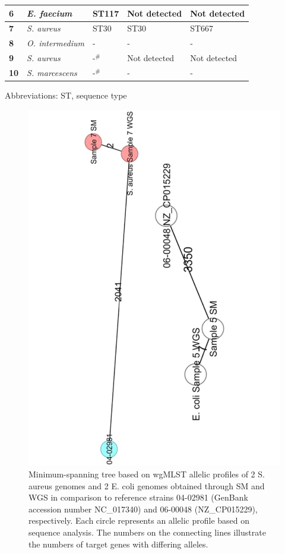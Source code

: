 \begin{table}[]
{\begin{tabular}{@{}|l|l|l|ll|@{}}
\textbf{6} &
 \textit{ E. faecium} &
  ST117 &
  \multicolumn{1}{l|}{Not detected} &
  Not detected \\ \midrule
\textbf{7} &
  \textit{S. aureus} &
  ST30 &
  \multicolumn{1}{l|}{ST30} &
  ST667 \\ \midrule
\textbf{8} &
  \textit{O. intermedium} &
  - &
  \multicolumn{1}{l|}{-} &
  - \\ \midrule
\textbf{9} &
  \textit{S. aureus} &
  -$^\#$  &
  \multicolumn{1}{l|}{Not detected} &
  Not detected \\ \midrule
\textbf{10} &
  \textit{S. marcescens} &
  -$^\#$ &
  \multicolumn{1}{l|}{-} &
  - \\ \bottomrule
\end{tabular}%
}
\item Abbreviations: ST, sequence type
\end{table}

\begin{figure}[h!]
\centering
\includegraphics[angle=-90,width=\textwidth]{figures/chapter 2/41598_2018_31873_Fig2_HTML.pdf}
\caption{Minimum-spanning tree based on wgMLST allelic profiles of 2 S. aureus genomes and 2 E. coli genomes obtained through SM and \ac{WGS} in comparison to reference strains 04-02981 (GenBank accession number NC\_017340) and 06-00048 (NZ\_CP015229), respectively. Each circle represents an allelic profile based on sequence analysis. The numbers on the connecting lines illustrate the numbers of target genes with differing alleles.}
\label{fig:chap2_figure2}
\end{figure}

